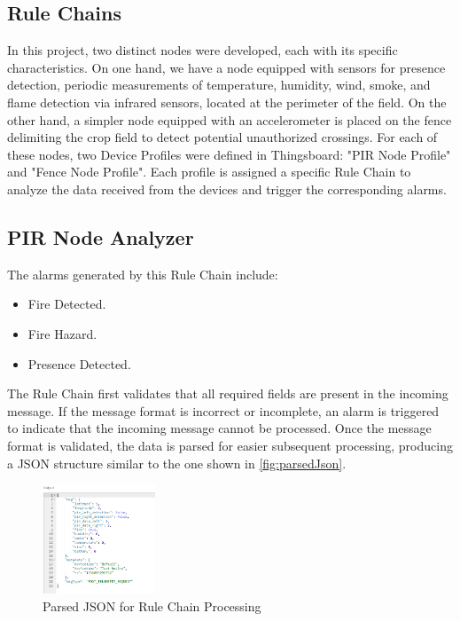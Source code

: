 \subsection{Rule Chains}
In this project, two distinct nodes were developed, each with its specific characteristics. On one hand, we have a node equipped with sensors for presence detection, 
periodic measurements of temperature, humidity, wind, smoke, and flame detection via infrared sensors, located at the perimeter of the field. On the other hand, a 
simpler node equipped with an accelerometer is placed on the fence delimiting the crop field to detect potential unauthorized crossings. For each of these nodes,
two Device Profiles were defined in Thingsboard: "PIR Node Profile" and "Fence Node Profile". Each profile is assigned a specific Rule Chain to analyze the data 
received from the devices and trigger the corresponding alarms.


\subsection{PIR Node Analyzer}
The alarms generated by this Rule Chain include:
\begin{itemize}
    \item Fire Detected.
    \item Fire Hazard.
    \item Presence Detected.
\end{itemize}

The Rule Chain first validates that all required fields are present in the incoming message. If the message format is incorrect or incomplete, an alarm is triggered 
to indicate that the incoming message cannot be processed. Once the message format is validated, the data is parsed for easier subsequent processing, producing a JSON
structure similar to the one shown in \autoref{fig:parsedJson}.

\begin{figure}[H]
    \centering
    \includegraphics[width=0.3\textwidth]{./images/8/jsonParsed.PNG}
    \caption{Parsed JSON for Rule Chain Processing}
    \label{fig:parsedJson}
\end{figure}

